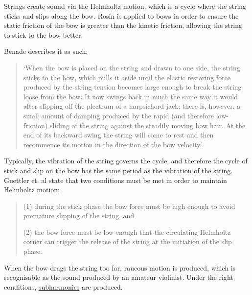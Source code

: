 Strings create sound via the Helmholtz motion, which is a cycle where the string sticks and slips along the bow.\autocite[]{wolfeBowsStrings}
Rosin is applied to bows in order to ensure the static friction of the bow is greater than the kinetic friction, allowing the string to stick to the bow better.

Benade describes it as such: 
\begin{quotation}
  `When the bow is placed on the string and drawn to one side, the string sticks to the bow, which pulls it aside until the elastic restoring force produced by the string tension becomes large enough to break the string loose from the bow.
  It now swings back in much the same way it would after slipping off the plectrum of a harpsichord jack; there is, however, a small amount of damping produced by the rapid (and therefore low-friction) sliding of the string against the steadily moving bow hair.
  At the end of its backward swing the string will come to rest and then recommence its motion in the direction of the bow velocity.'\autocite[516]{benadeFundamentalsMusicalAcoustics1990}
\end{quotation}
Typically, the vibration of the string governs the cycle, and therefore the cycle of stick and slip on the bow has the same period as the vibration of the string.\autocite[]{wolfeBowsStrings}
Guettler et. al state that two conditions must be met in order to maintain Helmholtz motion;
\begin{quotation}
  (1) during the stick phase the bow force must be high enough to avoid premature slipping of the string, and 

  (2) the bow force must be low enough that the circulating Helmholtz corner can trigger the release of the string at the initiation of the slip phase.
\end{quotation}

When the bow drags the string too far, raucous motion is produced, which is recognisable as the sound produced by an amateur violinist.
Under the right conditions, \hyperref[sec:subharmonics]{subharmonics} are produced.



